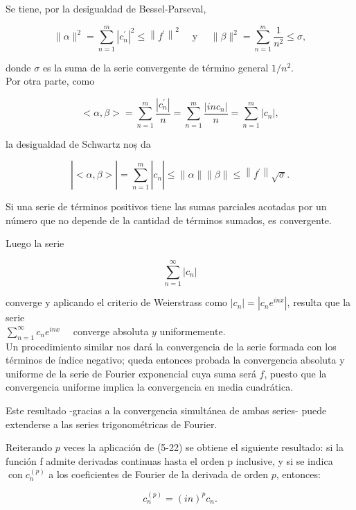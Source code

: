 \documentclass[10pt]{article}
\theoremstyle{plain}
\theoremstyle{definition}
\theoremstyle{remark}
\begin{document}
Se tiene, por la desigualdad de Bessel-Parseval,

$$
\|\alpha\|^{2}=\sum_{n=1}^{m}\left|c_{n}^{\prime}\right|^{2} \leqslant\left\|f^{\prime}\right\|^{2} \quad \text { y } \quad\|\beta\|^{2}=\sum_{n=1}^{m} \frac{1}{n^{2}} \leqslant \sigma,
$$

donde $\sigma$ es la suma de la serie convergente de término general $1 / n^{2}$.\\
Por otra parte, como

$$
<\alpha, \beta>=\sum_{n=1}^{m} \frac{\left|c_{n}^{\prime}\right|}{n}=\sum_{n=1}^{m} \frac{\left|i n c_{n}\right|}{n}=\sum_{n=1}^{m}\left|c_{n}\right|,
$$

la desigualdad de Schwartz noș da

$$
\left|<\alpha, \beta>\left|=\sum_{n=1}^{m}\right| c_{n}\right| \leqslant\|\alpha\|\|\beta\| \leqslant\left\|f^{\prime}\right\| \sqrt{\sigma} .
$$

Si una serie de términos positivos tiene las sumas parciales acotadas por un número que no depende de la cantidad de términos sumados, es convergente.

Luego la serie

$$
\sum_{n=1}^{\infty}\left|c_{n}\right|
$$

converge y aplicando el criterio de Weierstrass como $\left|c_{n}\right|=\left|c_{n} e^{i n x}\right|$, resulta que la serie\\
$\sum_{n=1}^{\infty} c_{n} e^{i n x} \quad$ converge absoluta $y$ uniformemente.\\
Un procedimiento similar nos dará la convergencia de la serie formada con los términos de índice negativo; queda entonces probada la convergencia absoluta y uniforme de la serie de Fourier exponencial cuya suma será $f$, puesto que la convergencia uniforme implica la convergencia en media cuadrática.

Este resultado -gracias a la convergencia simultánea de ambas series- puede extenderse a las series trigonométricas de Fourier.

Reiterando $p$ veces la aplicación de (5-22) se obtiene el siguiente resultado: si la función f admite derivadas continuas hasta el orden p inclusive, y si se indica $\operatorname{con} c_{n}^{(p)}$ a los coeficientes de Fourier de la derivada de orden $p$, entonces:


\begin{equation*}
c_{n}^{(p)}=(i n)^{p} c_{n} . \tag{5-23}
\end{equation*}
\end{document}
